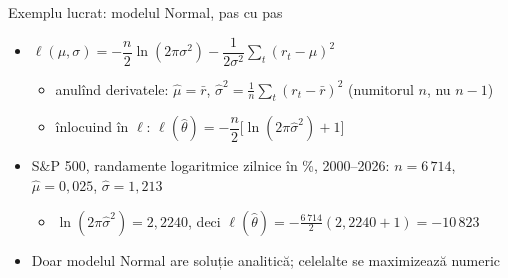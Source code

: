 \begin{frame}{Exemplu lucrat: modelul Normal, pas cu pas}
\itemsize{\small}
\begin{itemize}
    \item $\ell(\mu, \sigma) = -\dfrac{n}{2}\ln(2\pi\sigma^2) - \dfrac{1}{2\sigma^2}\sum_t (r_t - \mu)^2$
    \begin{itemize}
        \item anulînd derivatele: $\hat\mu = \bar r$, $\hat\sigma^2 = \frac{1}{n}\sum_t (r_t - \bar r)^2$ (numitorul $n$, nu $n - 1$)
        \item înlocuind în $\ell$: $\ell(\hat\theta) = -\dfrac{n}{2}\big[\ln(2\pi\hat\sigma^2) + 1\big]$
    \end{itemize}
    \item S\&P 500, randamente logaritmice zilnice în \%, 2000--2026: $n = 6\,714$, $\hat\mu = 0{,}025$, $\hat\sigma = 1{,}213$
    \begin{itemize}
        \item $\ln(2\pi\hat\sigma^2) = 2{,}2240$, deci $\ell(\hat\theta) = -\frac{6\,714}{2}(2{,}2240 + 1) = -10\,823$
    \end{itemize}
    \item Doar modelul Normal are soluție analitică; celelalte se maximizează numeric
\end{itemize}
\end{frame}

